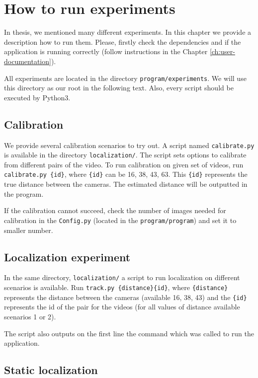 \chapter{How to run experiments}

In thesis, we mentioned many different experiments. In this chapter we provide
a description how to run them. Please, firstly check the dependencies and if
the application is running correctly (follow instructions in the Chapter \ref{ch:user-documentation}).

All experiments are located in the directory \texttt{program/experiments}. We
will use this directory as our root in the following text. Also, every script
should be executed by Python3.

\section{Calibration}

We provide several calibration scenarios to try out. A script named
\verb+calibrate.py+ is available in  the directory \verb+localization/+. The
script sets options to calibrate from different pairs of the video. To run
calibration on given set of videos, run \verb+calibrate.py {id}+, where
\verb+{id}+ can be 16, 38, 43, 63. This \verb+{id}+ represents the true
distance between the cameras. The estimated distance will be outputted in the
program.

If the calibration cannot succeed, check the number of images needed for
calibration in the \verb+Config.py+ (located in the \verb+program/program+)
and set it to smaller number.

\section{Localization experiment}

In the same directory, \verb+localization/+ a script to run
localization on different scenarios is available. Run \verb+track.py {distance}{id}+, 
where \verb+{distance}+ represents the distance between the cameras
(available 16, 38, 43) and the \verb+{id}+ represents the id of the pair for the
videos (for all values of distance available scenarios 1 or 2).

The script also outputs on the first line the command which was called to run
the application.

\section{Static localization}

